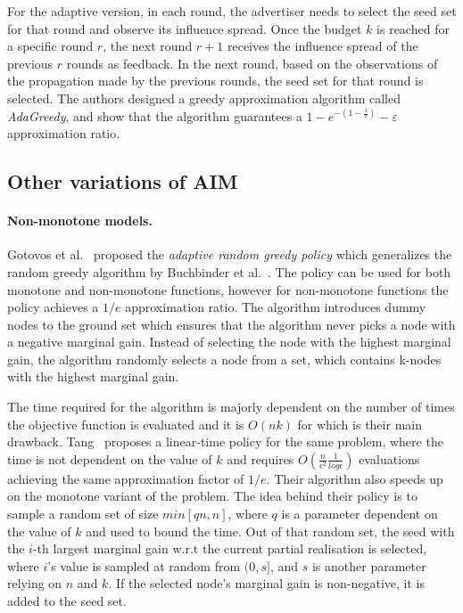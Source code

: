 For the adaptive version, in each round, the advertiser needs to select the seed set for that round and observe its influence spread. Once the budget $k$ is reached for a specific round $r$, the next round $r+1$ receives the influence spread of the previous $r$ rounds as feedback. In the next round, based on the observations of the propagation made by the previous rounds, the seed set for that round is selected. The authors designed a greedy approximation algorithm called \emph{AdaGreedy}, and show that the algorithm guarantees a $1-e^{-(1-\frac{1}{e})} - \varepsilon$ approximation ratio.


\subsection{Other variations of AIM} \label{sec:var}


\paragraph{Non-monotone models.}
 Gotovos et al.~\cite{gotovos} proposed the \textit{adaptive random greedy policy} which generalizes the random greedy algorithm by Buchbinder et al.~\cite{buchbinder}. The policy can be used for both monotone and non-monotone functions, however for non-monotone functions the policy achieves a $1/e$ approximation ratio. The algorithm introduces dummy nodes to the ground set which ensures that the algorithm never picks a node with a negative marginal gain. Instead of selecting the node with the highest marginal gain, the algorithm randomly selects a node from a set, which contains k-nodes with the highest marginal gain.



The time required for the algorithm is majorly dependent on the number of times the objective function is evaluated and it is $O(nk)$ for \cite{gotovos} which is their main drawback. Tang~\cite{TANG2021249} proposes a linear-time policy for the same problem, where the time is not dependent on the value of $k$ and requires $O(\frac{n}{\epsilon^2}\frac{1}{log \epsilon})$ evaluations achieving the same approximation factor of $1/e$. Their algorithm also speeds up on the monotone variant of the problem. The idea behind their policy is to sample a random set of size $min[qn,n]$, where $q$ is a parameter dependent on the value of $k$ and used to bound the time. Out of that random set, the seed with the $i$-th largest marginal gain w.r.t the current partial realisation is selected, where $i$'s value is sampled at random from $(0,s]$, and $s$ is another parameter relying on $n$ and $k$. If the selected node's marginal gain is non-negative, it is added to the seed set. 

